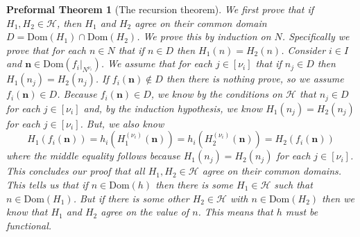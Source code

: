 \documentclass[oneside, 12pt]{book}
\theoremstyle{break}
\newtheorem{preformal definition}[definition]{Preformal Definition}
\newtheorem{preformal theorem}[theorem]{Preformal Theorem}
\newcommand{\bv}[1]{\boldsymbol{#1}}
\newcommand{\mc}[1]{\mathcal{#1}}
\begin{document}
\begin{preformal theorem}[The recursion theorem]
				We first prove that if $H_1, H_2 \in \mc{H}$, then $H_1$ and $H_2$ agree on their common domain $D = \text{Dom}(H_1) \cap \text{Dom}(H_2)$.
				We prove this by induction on $N$.
				Specifically we prove that for each $n\in N$ that if $n\in D$ then $H_1(n) = H_2(n)$.
				Consider $i\in I$ and $\bv{n} \in \text{Dom}(f_i|_{N^{\nu_i}})$.
				We assume that for each $j\in [\nu_i]$ that if $n_j \in D$ then $H_1(n_j) = H_2(n_j)$.
				If $f_i(\bv{n}) \not \in D$ then there is nothing prove, so we assume $f_i(\bv{n}) \in D$.
				Because $f_i(\bv{n}) \in D$, we know by the conditions on $\mc{H}$ that $n_j\in D$ for each $j\in [\nu_i]$ and, by the induction hypothesis, we know $H_1(n_j) = H_2(n_j)$ for each $j\in [\nu_i]$.
				But, we also know
				\begin{equation*}
					H_1(f_i(\bv{n})) = h_i\left(H_1^{(\nu_i)}(\bv{n})\right) = h_i\left(H_2^{(\nu_i)}(\bv{n})\right) = H_2(f_i(\bv{n}))
				\end{equation*}
				where the middle equality follows because $H_1(n_j) = H_2(n_j)$ for each $j\in [\nu_i]$.
				This concludes our proof that all $H_1, H_2 \in \mc{H}$ agree on their common domains.
				This tells us that if $n\in \text{Dom}(h)$ then there is some $H_1 \in \mc{H}$ such that $n\in \text{Dom}(H_1)$.
				But if there is some other $H_2 \in \mc{H}$ with $n\in \text{Dom}(H_2)$ then we know that $H_1$ and $H_2$ agree on the value of $n$.
				This means that $h$ must be functional.
				

\end{preformal theorem}
\end{document}
